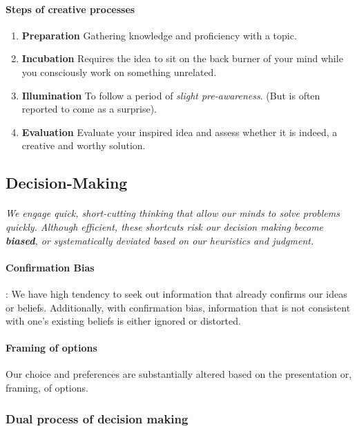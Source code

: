 \documentclass{article}
\begin{document}
	\paragraph{Steps of creative processes}
	\begin{enumerate}
		\item \textbf{Preparation} Gathering knowledge and proficiency with a topic.
		\item \textbf{Incubation} Requires the idea to sit on the back burner of your mind while you consciously work on something unrelated.
		\item \textbf{Illumination} To follow a period of \emph{slight pre-awareness}. (But is often reported to come as a surprise).
		\item \textbf{Evaluation} Evaluate your inspired idea and assess whether it is indeed, a creative and worthy solution.
	\end{enumerate}

	\subsection{Decision-Making}
	\paragraph{}\emph{We engage quick, short-cutting thinking that allow our minds to solve problems quickly. Although efficient, these shortcuts risk our decision making become \textbf{biased}, or systematically deviated based on our heuristics and judgment.}

	\paragraph{Confirmation Bias}: We have high tendency to seek out information that already confirms our ideas or beliefs. Additionally, with confirmation bias, information that is not consistent with one's existing beliefs is either ignored or distorted.

	\paragraph{Framing of options} Our choice and preferences are substantially altered based on the presentation or, framing, of options.

	\subsubsection{Dual process of decision making}
\end{document}
